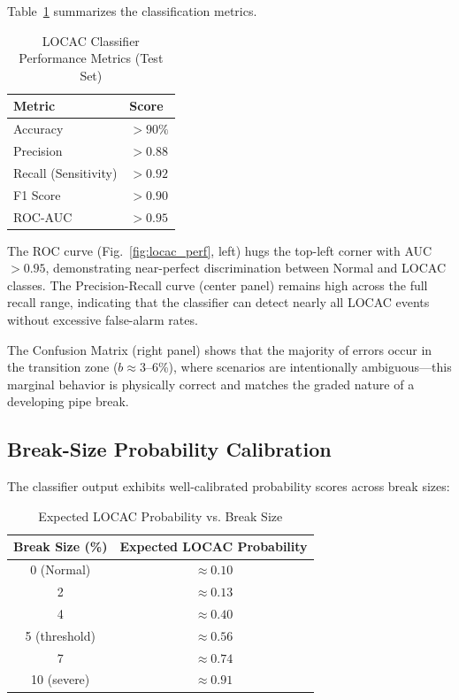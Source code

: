 \documentclass[conference]{IEEEtran}
\begin{document}
Table~\ref{tab:locac_metrics} summarizes the classification metrics.

\begin{table}[htbp]
\caption{LOCAC Classifier Performance Metrics (Test Set)}
\label{tab:locac_metrics}
\centering
\begin{tabular}{ll}
\toprule
\textbf{Metric} & \textbf{Score} \\
\midrule
Accuracy & $>90\%$ \\
Precision & $>0.88$ \\
Recall (Sensitivity) & $>0.92$ \\
F1 Score & $>0.90$ \\
ROC-AUC & $>0.95$ \\
\bottomrule
\end{tabular}
\end{table}

The ROC curve (Fig.~\ref{fig:locac_perf}, left) hugs the top-left corner with AUC $> 0.95$, demonstrating near-perfect discrimination between Normal and LOCAC classes. The Precision-Recall curve (center panel) remains high across the full recall range, indicating that the classifier can detect nearly all LOCAC events without excessive false-alarm rates.

The Confusion Matrix (right panel) shows that the majority of errors occur in the transition zone ($b \approx 3$–6\%), where scenarios are intentionally ambiguous—this marginal behavior is physically correct and matches the graded nature of a developing pipe break.

\subsection{Break-Size Probability Calibration}

The classifier output exhibits well-calibrated probability scores across break sizes:

\begin{table}[htbp]
\caption{Expected LOCAC Probability vs. Break Size}
\label{tab:probability}
\centering
\begin{tabular}{cc}
\toprule
\textbf{Break Size (\%)} & \textbf{Expected LOCAC Probability} \\
\midrule
0 (Normal) & $\approx 0.10$ \\
2 & $\approx 0.13$ \\
4 & $\approx 0.40$ \\
5 (threshold) & $\approx 0.56$ \\
7 & $\approx 0.74$ \\
10 (severe) & $\approx 0.91$ \\
\bottomrule
\end{tabular}
\end{table}
\end{document}
